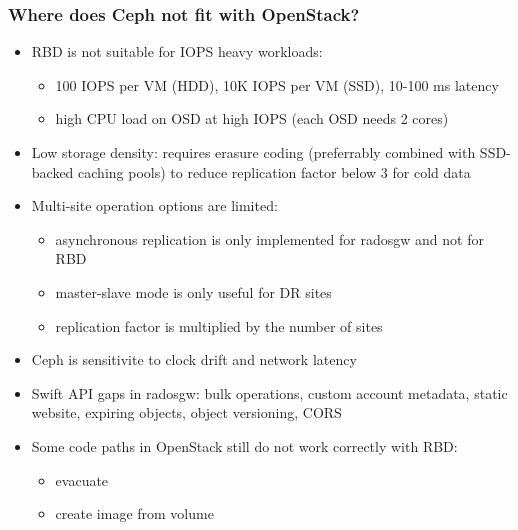 \documentclass[hyperref=unicode,utf8,xcolor=pst,aspectratio=169]{beamer}
\begin{document}
\begin{frame}
	\frametitle{Where does Ceph not fit with OpenStack?}
	\begin{itemize}
		\item RBD is not suitable for {\color{mirantisred}IOPS heavy
			workloads}:
			\begin{itemize}
				\item 100 IOPS per VM (HDD),
					10K IOPS per VM (SSD),
					10-100 ms latency
				\item high CPU load on OSD at high IOPS
					(each OSD needs 2 cores)
			\end{itemize}
		\item Low {\color{mirantisred}storage density}: requires
			erasure coding (preferrably combined with SSD-backed
			caching pools) to reduce replication factor below 3 for
			cold data
		\item {\color{mirantisred}Multi-site operation} options are
			limited:
			\begin{itemize}
				\item asynchronous replication is only
					implemented for radosgw and not for
					RBD
				\item master-slave mode is only useful for DR
					sites
				\item replication factor is multiplied by the
					number of sites
			\end{itemize}
		\item Ceph is sensitivite to {\color{mirantisred}clock drift}
			and {\color{mirantisred}network latency}
		\item {\color{mirantisred}Swift API} gaps in radosgw: bulk
			operations, custom account metadata, static website,
			expiring objects, object versioning, CORS
		\item Some code paths in OpenStack still do not work correctly
			with RBD:
			\begin{itemize}
				\item evacuate
				\item create image from volume
			\end{itemize}
	\end{itemize}
\end{frame}
\end{document}
